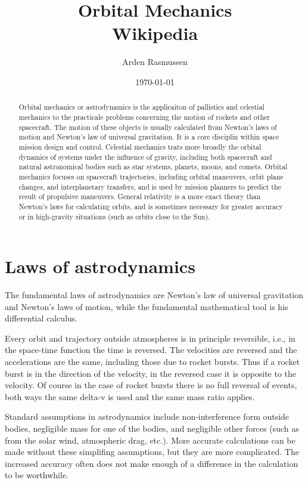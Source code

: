 \documentclass[12pt]{article}
\title{Orbital Mechanics\\\small{Wikipedia}}
\date{\today}
\author{Arden Rasmussen}
\begin{document}
\maketitle
\newpage
{}
\begin{abstract}
  Orbital mechanics or astrodynamics is the applicaiton of pallistics and celestial mechanics to the practicale problems concerning the motion of rockets and other spacecraft. The motion of these objects is usually calculated from Newton's laws of motion and Newton's law of universal gravitation. It is a core disciplin within space mission design and control. Celestial mechanics trats more broadly the orbital dynamics of systems under the influence of gravity, including both spacecraft and natural astronomical bodies such as star systems, planets, moons, and comets. Orbital mechanics focuses on spacecraft trajectories, including orbital maneuvers, orbit plane changes, and interplanetary transfers, and is used by mission planners to predict the result of propulsive maneuvers. General relativity is a more exact theory than Newton's laws for calculating orbits, and is sometimes necessary for greater accuracy or in high-gravity situations (such as orbits close to the Sun).
\end{abstract}
\newpage
\tableofcontents
\newpage
{}

\section{Laws of astrodynamics}

The fundamental laws of astrodynamics are Newton's law of universal gravitation and Newton's laws of motion, while the fundamental mathematical tool is his differential calculus.

Every orbit and trajectory outside atmospheres is in principle reversible, i.e., in the space-time function the time is reversed. The velocities are reversed and the accelerations are the same, including those due to rocket bursts. Thus if a rocket burst is in the direction of the velocity, in the reversed case it is opposite to the velocity. Of course in the case of rocket bursts there is no full reversal of events, both ways the same delta-v is used and the same mass ratio applies.

Standard assumptions in astrodynamics include non-interference form outside bodies, negligible mass for one of the bodies, and negligible other forces (such as from the solar wind, atmospheric drag, etc.). More accurate calculations can be made without these simplifing assumptions, but they are more complicated. The increased accuracy often does not make enough of a difference in the calculation to be worthwhile.
\end{document}
